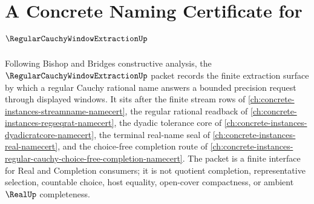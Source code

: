 \chapter{A Concrete Naming Certificate for $\RegularCauchyWindowExtractionUp$}
\label{ch:concrete-instances-regular-cauchy-window-extraction-namecert}

Following Bishop and Bridges constructive analysis, the $\RegularCauchyWindowExtractionUp$ packet records the finite extraction surface by which a regular Cauchy rational name answers a bounded precision request through displayed windows. It sits after the finite stream rows of \autoref{ch:concrete-instances-streamname-namecert}, the regular rational readback of \autoref{ch:concrete-instances-regseqrat-namecert}, the dyadic tolerance core of \autoref{ch:concrete-instances-dyadicratcore-namecert}, the terminal real-name seal of \autoref{ch:concrete-instances-real-namecert}, and the choice-free completion route of \autoref{ch:concrete-instances-regular-cauchy-choice-free-completion-namecert}. The packet is a finite interface for Real and Completion consumers; it is not quotient completion, representative selection, countable choice, host equality, open-cover compactness, or ambient $\RealUp$ completeness.

